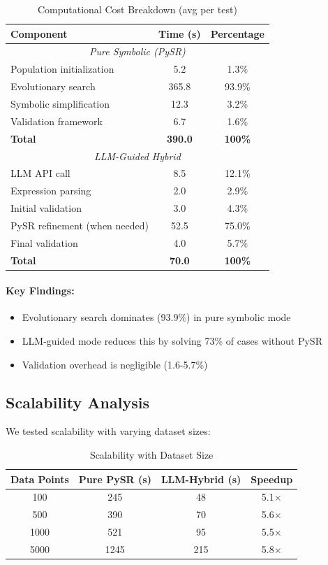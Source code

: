 \documentclass[twoside,11pt]{article}
\begin{document}
\begin{table}[H]
\centering
\caption{Computational Cost Breakdown (avg per test)}
\label{tab:timing_breakdown}
\begin{tabular}{@{}lcc@{}}
\toprule
\textbf{Component} & \textbf{Time (s)} & \textbf{Percentage} \\
\midrule
\multicolumn{3}{c}{\textit{Pure Symbolic (PySR)}} \\
\midrule
Population initialization & 5.2 & 1.3\% \\
Evolutionary search & 365.8 & 93.9\% \\
Symbolic simplification & 12.3 & 3.2\% \\
Validation framework & 6.7 & 1.6\% \\
\midrule
\textbf{Total} & \textbf{390.0} & \textbf{100\%} \\
\midrule
\multicolumn{3}{c}{\textit{LLM-Guided Hybrid}} \\
\midrule
LLM API call & 8.5 & 12.1\% \\
Expression parsing & 2.0 & 2.9\% \\
Initial validation & 3.0 & 4.3\% \\
PySR refinement (when needed) & 52.5 & 75.0\% \\
Final validation & 4.0 & 5.7\% \\
\midrule
\textbf{Total} & \textbf{70.0} & \textbf{100\%} \\
\bottomrule
\end{tabular}
\end{table}

\paragraph{Key Findings:}
\begin{itemize}
\item Evolutionary search dominates (93.9\%) in pure symbolic mode
\item LLM-guided mode reduces this by solving 73\% of cases without PySR
\item Validation overhead is negligible (1.6-5.7\%)
\end{itemize}

\subsection{Scalability Analysis}

We tested scalability with varying dataset sizes:

\begin{table}[H]
\centering
\caption{Scalability with Dataset Size}
\label{tab:scalability}
\begin{tabular}{@{}cccc@{}}
\toprule
\textbf{Data Points} & \textbf{Pure PySR (s)} & \textbf{LLM-Hybrid (s)} & \textbf{Speedup} \\
\midrule
100 & 245 & 48 & 5.1$\times$ \\
500 & 390 & 70 & 5.6$\times$ \\
1000 & 521 & 95 & 5.5$\times$ \\
5000 & 1245 & 215 & 5.8$\times$ \\
\bottomrule
\end{tabular}
\end{table}
\end{document}

